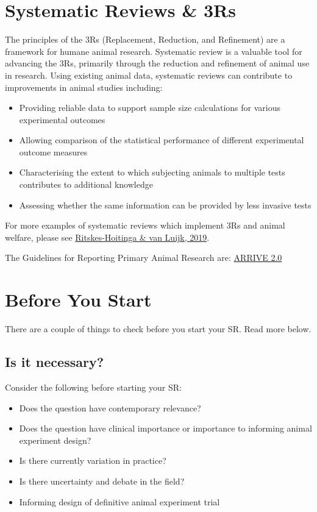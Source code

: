 \documentclass[
]{book}
\providecommand{\tightlist}{%
  \setlength{\itemsep}{0pt}\setlength{\parskip}{0pt}}
\begin{document}
\chapter{Systematic Reviews \& 3Rs}\label{srs-3rs}

The principles of the 3Rs (Replacement, Reduction, and Refinement) are a framework for humane animal research. Systematic review is a valuable tool for advancing the 3Rs, primarily through the reduction and refinement of animal use in research. Using existing animal data, systematic reviews can contribute to improvements in animal studies including:

\begin{itemize}
\tightlist
\item
  Providing reliable data to support sample size calculations for various experimental outcomes
\item
  Allowing comparison of the statistical performance of different experimental outcome measures
\item
  Characterising the extent to which subjecting animals to multiple tests contributes to additional knowledge
\item
  Assessing whether the same information can be provided by less invasive tests
\end{itemize}

For more examples of systematic reviews which implement 3Rs and animal welfare, please see \href{https://www.mdpi.com/2076-2615/9/12/1163/htm}{Ritskes-Hoitinga \& van Luijk, 2019}.

The Guidelines for Reporting Primary Animal Research are: \href{https://journals.plos.org/plosbiology/article?id=10.1371/journal.pbio.3000410}{ARRIVE 2.0}

\chapter{Before You Start}\label{b4ustart}

There are a couple of things to check before you start your SR. Read more below.

\section{Is it necessary?}\label{is-it-necessary}

Consider the following before starting your SR:

\begin{itemize}
\tightlist
\item
  Does the question have contemporary relevance?
\item
  Does the question have clinical importance or importance to informing animal experiment design?
\item
  Is there currently variation in practice?
\item
  Is there uncertainty and debate in the field?
\item
  Informing design of definitive animal experiment trial
\end{itemize}
\end{document}
